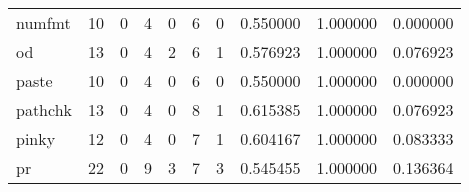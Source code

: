 \begin{tabular}{lrrrrrrrrr}
numfmt    &                                       10 &                                                  0 &                                                  4 &                                                  0 &                                                  6 &                                                  0 &                                           0.550000 &                               1.000000 &                             0.000000 \\
od        &                                       13 &                                                  0 &                                                  4 &                                                  2 &                                                  6 &                                                  1 &                                           0.576923 &                               1.000000 &                             0.076923 \\
paste     &                                       10 &                                                  0 &                                                  4 &                                                  0 &                                                  6 &                                                  0 &                                           0.550000 &                               1.000000 &                             0.000000 \\
pathchk   &                                       13 &                                                  0 &                                                  4 &                                                  0 &                                                  8 &                                                  1 &                                           0.615385 &                               1.000000 &                             0.076923 \\
pinky     &                                       12 &                                                  0 &                                                  4 &                                                  0 &                                                  7 &                                                  1 &                                           0.604167 &                               1.000000 &                             0.083333 \\
pr        &                                       22 &                                                  0 &                                                  9 &                                                  3 &                                                  7 &                                                  3 &                                           0.545455 &                               1.000000 &                             0.136364 \\

\end{tabular}
